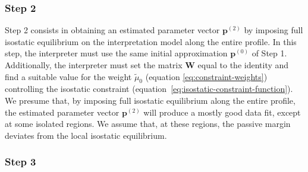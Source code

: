 \documentclass[manuscript]{geophysics}
\begin{document}
\subsubsection{Step 2}

Step 2 consists in obtaining an estimated parameter vector $\mathbf{p}^{(2)}$
by imposing full isostatic equilibrium on the interpretation model along the entire profile.
In this step, the interpreter must use the same initial approximation $\mathbf{p}^{(0)}$
of Step 1.
Additionally, the interpreter must set the matrix $\mathbf{W}$
equal to the identity and find a suitable value for the weight $\tilde{\mu}_{0}$ 
(equation \ref{eq:constraint-weights}) controlling the isostatic constraint 
(equation~\ref{eq:isostatic-constraint-function}).
We presume that, by imposing full isostatic equilibrium along the entire profile,
the estimated parameter vector $\mathbf{p}^{(2)}$ will produce a mostly good data fit,
except at some isolated regions. 
We assume that, at these regions, the passive margin deviates 
from the local isostatic equilibrium.

\subsubsection{Step 3}
\end{document}
